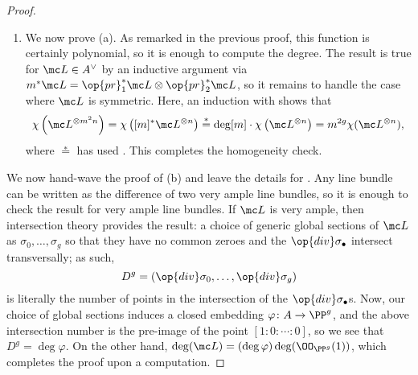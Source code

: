 \documentclass[../notes.tex]{subfiles}
\begin{document}
\begin{proof}
\begin{enumerate}
		\item We now prove (a). As remarked in the previous proof, this function is certainly polynomial, so it is enough to compute the degree. The result is true for $\mc L\in A^\lor$ by an inductive argument via $m^*\mc L=\op{pr}_1^*\mc L\otimes\op{pr}_2^*\mc L$, so it remains to handle the case where $\mc L$ is symmetric. Here, an induction with  shows that
		\[\chi\left(\mc L^{\otimes m^2n}\right)=\chi\left([m]^*\mc L^{\otimes n}\right)\stackrel*=\deg[m]\cdot\chi\left(\mc L^{\otimes n}\right)=m^{2g}\chi(\mc L^{\otimes n}),\]
		where $\stackrel*=$ has used . This completes the homogeneity check.
	\end{enumerate}
	We now hand-wave the proof of (b) and leave the details for \cite[Theorem~III.16]{mumford}. Any line bundle can be written as the difference of two very ample line bundles, so it is enough to check the result for very ample line bundles. If $\mc L$ is very ample, then intersection theory provides the result: a choice of generic global sections of $\mc L$ as $\sigma_0,\ldots,\sigma_g$ so that they have no common zeroes and the $\op{div}\sigma_\bullet$ intersect transversally; as such,
	\[D^g=(\op{div}\sigma_0,\ldots,\op{div}\sigma_g)\]
	is literally the number of points in the intersection of the $\op{div}\sigma_\bullet$s. Now, our choice of global sections induces a closed embedding $\varphi\colon A\to\PP^g$, and the above intersection number is the pre-image of the point $[1:0:\cdots:0]$, so we see that $D^g=\deg\varphi$. On the other hand, $\deg(\mc L)=(\deg\varphi)\deg(\OO_{\PP^g}(1))$, which completes the proof upon a computation.
\end{proof}
\end{document}

